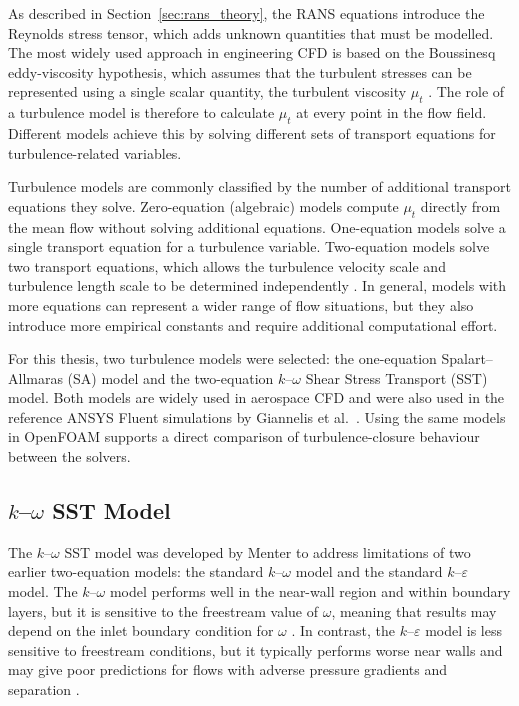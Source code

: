 As described in Section~\ref{sec:rans_theory}, the RANS equations introduce the Reynolds stress tensor, which adds unknown quantities that must be modelled. The most widely used approach in engineering CFD is based on the Boussinesq eddy-viscosity hypothesis, which assumes that the turbulent stresses can be represented using a single scalar quantity, the turbulent viscosity $\mu_t$ \cite{Pope2000TurbulentFlows,VersteegMalalasekera2007CFD,Wilcox2006TurbulenceModeling}. The role of a turbulence model is therefore to calculate $\mu_t$ at every point in the flow field. Different models achieve this by solving different sets of transport equations for turbulence-related variables.

Turbulence models are commonly classified by the number of additional transport equations they solve. Zero-equation (algebraic) models compute $\mu_t$ directly from the mean flow without solving additional equations. One-equation models solve a single transport equation for a turbulence variable. Two-equation models solve two transport equations, which allows the turbulence velocity scale and turbulence length scale to be determined independently \cite{VersteegMalalasekera2007CFD,Wilcox2006TurbulenceModeling}. In general, models with more equations can represent a wider range of flow situations, but they also introduce more empirical constants and require additional computational effort.

For this thesis, two turbulence models were selected: the one-equation Spalart--Allmaras (SA) model and the two-equation $k$--$\omega$ Shear Stress Transport (SST) model. Both models are widely used in aerospace CFD and were also used in the reference ANSYS Fluent simulations by Giannelis et al.~\cite{Giannelis2023SSAMGen5}. Using the same models in OpenFOAM supports a direct comparison of turbulence-closure behaviour between the solvers.

\subsection{$k$--$\omega$ SST Model}
\label{sec:sst_model}

The $k$--$\omega$ SST model was developed by Menter \cite{Menter1994SST} to address limitations of two earlier two-equation models: the standard $k$--$\omega$ model and the standard $k$--$\varepsilon$ model. The $k$--$\omega$ model performs well in the near-wall region and within boundary layers, but it is sensitive to the freestream value of $\omega$, meaning that results may depend on the inlet boundary condition for $\omega$ \cite{Wilcox2006TurbulenceModeling,Menter1994SST}. In contrast, the $k$--$\varepsilon$ model is less sensitive to freestream conditions, but it typically performs worse near walls and may give poor predictions for flows with adverse pressure gradients and separation \cite{VersteegMalalasekera2007CFD,Wilcox2006TurbulenceModeling}.

